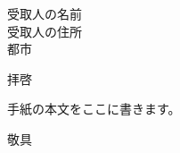 \documentclass{letter}
\begin{document}
\begin{letter}{受取人の名前 \\ 受取人の住所 \\ 都市}
\opening{拝啓}

手紙の本文をここに書きます。

\closing{敬具}

\end{letter}
\end{document}
